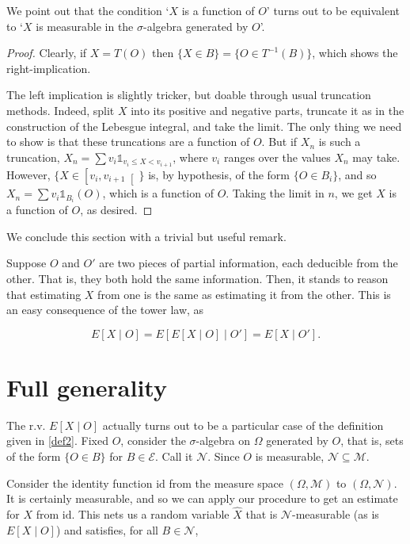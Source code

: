 \documentclass{article}
\let\mathbbalt\mathbb
\let\mathbbu\mathbb
\let\mathbb\mathbbalt
\newcommand{\M}{\mathcal{M}}
\newcommand{\N}{\mathcal{N}}
\newcommand{\E}{\mathcal{E}}
\newcommand{\id}{\mathrm{id}}
\newcommand{\ind}{\mathbbu{1}}
\begin{document}
	We point out that the condition `$X$ is a function of $O$' turns out to be equivalent to `$X$ is measurable in the $\sigma$-algebra generated by $O$'.
	
	\begin{proof}
	Clearly, if $X = T(O)$ then $\{X \in B\} = \{O \in T^{-1}(B)\}$, which shows the right-implication.
	
	The left implication is slightly tricker, but doable through usual truncation methods. Indeed, split $X$ into its positive and negative parts, truncate it as in the construction of the Lebesgue integral, and take the limit. The only thing we need to show is that these truncations are a function of $O$. But if $X_n$ is such a truncation, $X_n = \sum v_i \ind_{v_i \leq X < v_{i+1}}$, where $v_i$ ranges over the values $X_n$ may take. However, $\{X \in \left[v_i, v_{i+1}\right[\}$ is, by hypothesis, of the form $\{O \in B_i\}$, and so $X_n = \sum v_i \ind_{B_i}(O)$, which is a function of $O$. Taking the limit in $n$, we get $X$ is a function of $O$, as desired.
	\end{proof}
	
	We conclude this section with a trivial but useful remark.
	
	Suppose $O$ and $O'$ are two pieces of partial information, each deducible from the other. That is, they both hold the same information. Then, it stands to reason that estimating $X$ from one is the same as estimating it from the other. This is an easy consequence of the tower law, as
	
	\[ E[X \mid O] = E[E[X \mid O] \mid O'] = E[X \mid O'].\]
	
	\section{Full generality}
	
	The r.v. $E[X \mid O]$ actually turns out to be a particular case of the definition given in \eqref{def2}. Fixed $O$, consider the $\sigma$-algebra on $\Omega$ generated by $O$, that is, sets of the form $\{O \in B\}$ for $B \in \E$. Call it $\N$. Since $O$ is measurable, $\N \subseteq \M$.
	
	Consider the identity function $\id$ from the measure space $(\Omega, \M)$ to $(\Omega, \N)$. It is certainly measurable, and so we can apply our procedure to get an estimate for $X$ from $\id$. This nets us a random variable $\hat X$ that is $\N$-measurable (as is $E[X \mid O]$) and satisfies, for all $B \in \N$,
	
\end{document}

